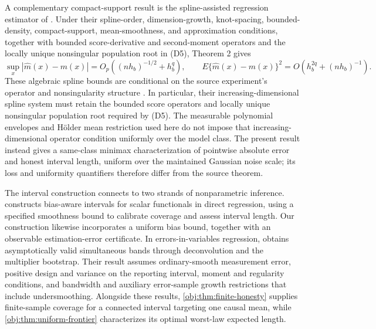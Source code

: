 \documentclass[11pt]{article}
\begin{document}
A complementary compact-support result is the spline-assisted regression estimator of \citet{JiangMaCarroll2026}. Under their spline-order, dimension-growth, knot-spacing, bounded-density, compact-support, mean-smoothness, and approximation conditions, together with bounded score-derivative and second-moment operators and the locally unique nonsingular population root in (D5), Theorem 2 gives
\[
\sup_x |\widehat m(x)-m(x)|
=O_p\!\left((nh_b)^{-1/2}+h_b^q\right),
\qquad
E\{\widehat m(x)-m(x)\}^2
=O\!\left(h_b^{2q}+(nh_b)^{-1}\right).
\]
These algebraic spline bounds are conditional on the source experiment's operator and nonsingularity structure \citep[Theorem 2, conditions (C2)--(C4) and (D1)--(D5)]{JiangMaCarroll2026}. In particular, their increasing-dimensional spline system must retain the bounded score operators and locally unique nonsingular population root required by (D5). The measurable polynomial envelopes and Hölder mean restriction used here do not impose that increasing-dimensional operator condition uniformly over the model class. The present result instead gives a same-class minimax characterization of pointwise absolute error and honest interval length, uniform over the maintained Gaussian noise scale; its loss and uniformity quantifiers therefore differ from the source theorem.

The interval construction connects to two strands of nonparametric inference. \citet[Sections 2--3]{ArmstrongKolesar2020} constructs bias-aware intervals for scalar functionals in direct regression, using a specified smoothness bound to calibrate coverage and assess interval length. Our construction likewise incorporates a uniform bias bound, together with an observable estimation-error certificate. In errors-in-variables regression, \citet[Assumption 3.1 and Theorem 3.2]{KatoSasaki2019} obtains asymptotically valid simultaneous bands through deconvolution and the multiplier bootstrap. Their result assumes ordinary-smooth measurement error, positive design and variance on the reporting interval, moment and regularity conditions, and bandwidth and auxiliary error-sample growth restrictions that include undersmoothing. Alongside these results, \cref{obj:thm:finite-honesty} supplies finite-sample coverage for a connected interval targeting one causal mean, while \cref{obj:thm:uniform-frontier} characterizes its optimal worst-law expected length.
\end{document}
